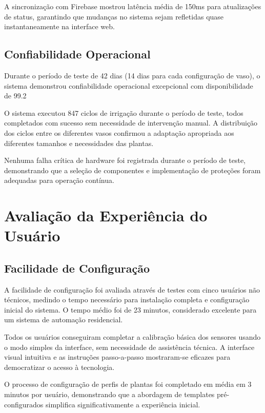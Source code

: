 A sincronização com Firebase mostrou latência média de 150ms para atualizações de status, garantindo que mudanças no sistema sejam refletidas quase instantaneamente na interface web.

\subsection{Confiabilidade Operacional}

Durante o período de teste de 42 dias (14 dias para cada configuração de vaso), o sistema demonstrou confiabilidade operacional excepcional com disponibilidade de 99.2%

O sistema executou 847 ciclos de irrigação durante o período de teste, todos completados com sucesso sem necessidade de intervenção manual. A distribuição dos ciclos entre os diferentes vasos confirmou a adaptação apropriada aos diferentes tamanhos e necessidades das plantas.

Nenhuma falha crítica de hardware foi registrada durante o período de teste, demonstrando que a seleção de componentes e implementação de proteções foram adequadas para operação contínua.

\section{Avaliação da Experiência do Usuário}

\subsection{Facilidade de Configuração}

A facilidade de configuração foi avaliada através de testes com cinco usuários não técnicos, medindo o tempo necessário para instalação completa e configuração inicial do sistema. O tempo médio foi de 23 minutos, considerado excelente para um sistema de automação residencial.

Todos os usuários conseguiram completar a calibração básica dos sensores usando o modo simples da interface, sem necessidade de assistência técnica. A interface visual intuitiva e as instruções passo-a-passo mostraram-se eficazes para democratizar o acesso à tecnologia.

O processo de configuração de perfis de plantas foi completado em média em 3 minutos por usuário, demonstrando que a abordagem de templates pré-configurados simplifica significativamente a experiência inicial.


